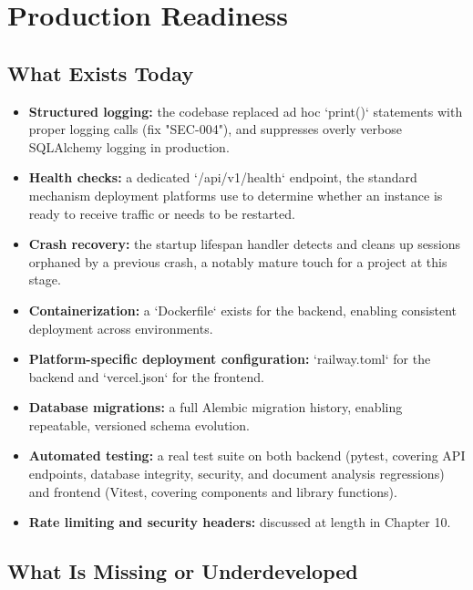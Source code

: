 \documentclass[11pt,a4paper]{report}
\begin{document}
\chapter{Production Readiness}

\section{What Exists Today}

\begin{itemize}[leftmargin=*]
  \item \textbf{Structured logging:} the codebase replaced ad hoc `print()` statements with proper logging calls (fix "SEC-004"), and suppresses overly verbose SQLAlchemy logging in production.
  \item \textbf{Health checks:} a dedicated `/api/v1/health` endpoint, the standard mechanism deployment platforms use to determine whether an instance is ready to receive traffic or needs to be restarted.
  \item \textbf{Crash recovery:} the startup lifespan handler detects and cleans up sessions orphaned by a previous crash, a notably mature touch for a project at this stage.
  \item \textbf{Containerization:} a `Dockerfile` exists for the backend, enabling consistent deployment across environments.
  \item \textbf{Platform-specific deployment configuration:} `railway.toml` for the backend and `vercel.json` for the frontend.
  \item \textbf{Database migrations:} a full Alembic migration history, enabling repeatable, versioned schema evolution.
  \item \textbf{Automated testing:} a real test suite on both backend (pytest, covering API endpoints, database integrity, security, and document analysis regressions) and frontend (Vitest, covering components and library functions).
  \item \textbf{Rate limiting and security headers:} discussed at length in Chapter 10.
\end{itemize}

\section{What Is Missing or Underdeveloped}
\end{document}
